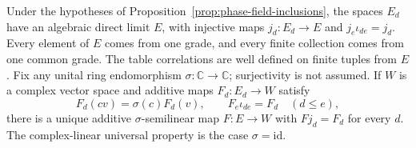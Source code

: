 \begin{proposition}
\label{prop:phase-field-union}
Under the hypotheses of Proposition~\ref{prop:phase-field-inclusions},
the spaces $E_d$ have an algebraic direct limit $E$, with injective maps
$j_d:E_d\to E$ and $j_e\iota_{de}=j_d$. Every element of $E$ comes from
one grade, and every finite collection comes from one common grade. The
table correlations are well defined on finite tuples from $E$.
Fix any unital ring endomorphism $\sigma:\mathbb C\to\mathbb C$;
surjectivity is not assumed. If $W$ is a complex vector space and additive
maps $F_d:E_d\to W$ satisfy
\[
 F_d(cv)=\sigma(c)F_d(v),\qquad F_e\iota_{de}=F_d\quad(d\le e),
\]
there is a unique additive $\sigma$-semilinear map $F:E\to W$ with
$Fj_d=F_d$ for every $d$. The complex-linear universal property is the
case $\sigma=\mathrm{id}$.
\end{proposition}
